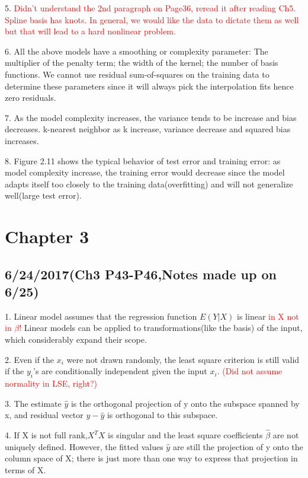 \documentclass[a4paper, 12pt]{article}
\begin{document}
5.  \textcolor{red}{ 
Didn't understand the 2nd paragraph on Page36, reread it after reading Ch5. Spline basis has knots. In general, we would like the data to dictate them as well but that will lead to a hard nonlinear problem.
}

6. All the above models have a smoothing or complexity parameter: The multiplier of the penalty term; the width of the kernel; the number of basis functions. We cannot use residual sum-of-squares on the training data to determine these parameters since it will always pick the interpolation fits hence zero residuals.

7. As the model complexity increases, the variance tends to be increase and bias decreases. k-nearest neighbor as k increase, variance decrease and squared bias increases.

8. Figure 2.11 shows the typical behavior of test error and training error: as model complexity increase, the training error would decrease since the model adapts itself too closely to the training data(overfitting) and will not generalize well(large test error).

\section*{Chapter 3}

\subsection*{6/24/2017(Ch3 P43-P46,Notes made up on 6/25)}

1. Linear model assumes that the regression function $E(Y|X)$ is linear \textcolor{red}{  in X not in $\beta$! } Linear models can be applied to transformations(like the basis) of the input, which considerably expand their scope.

2. Even if the $x_i$ were not drawn randomly, the least square criterion is still valid if the $y_i$'s are conditionally independent given the input $x_i$.\textcolor{red}{ (Did not assume normality in LSE, right?) }

3. The estimate $\hat{y}$ is the orthogonal projection of y onto the subspace spanned by x, and residual vector $y-\hat{y}$ is orthogonal to this subspace.

4. If X is not full rank,$X^TX$ is singular and the least square coefficients $\hat{\beta}$ are not uniquely defined. However, the fitted values $\hat{y}$ are still the projection of y onto the column space of X; there is just more than one way to express that projection in terms of X.
\end{document}
